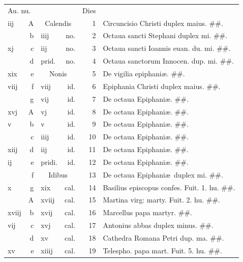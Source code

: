 \documentclass[a5paper,10pt]{book}
\def\ae{æ}
\begin{document}
\begin{center}
\begin{tabular}{l r l r r l}
\multicolumn{2}{l}{\color{red}Au. nu.} & & & \color{red} Dies & \\
iij & \color{red} A & \multicolumn{2}{c}{\color{red} Calendis} & 1 & \color{red}Circuncisio Christi duplex maius. \color{black} \#\#.\\
 & b & iiij & no. & 2 & Octaua sancti Stephani duplex mi. \color{black} \#\#.\\
xj & c & iij & no. & 3 & Octaua sancti Ioannis euan. du. mi. \color{black} \#\#.\\
 & d & \color{red} prid. & no. & 4 & Octaua sanctorum Innocen. dup. mi. \color{black} \#\#.\\
xix & e & \multicolumn{2}{c}{\color{red} Nonis} & 5 & De vigilia epiphani\ae . \color{black} \#\#.\\
viij & f & viij & id. & 6 & \color{red} Epiphania Christi duplex maius. \color{black} \#\#.\\
 & g & vij & id. & 7 & De octaua Epiphani\ae . \color{black} \#\#.\\
xvj & \color{red} A & vj & id. & 8 & De octaua Epiphani\ae . \color{black} \#\#.\\
v & b & v & id. & 9 & De octaua Epiphani\ae . \color{black} \#\#.\\
 & c & iiij & id. & 10 & De octaua Epiphani\ae . \color{black} \#\#.\\
xiij & d & iij & id. & 11 & De octaua Epiphani\ae . \color{black} \#\#.\\
ij & e & \color{red} pridi. & id. & 12 & De octaua Epiphani\ae . \color{black} \#\#.\\
 & f & \multicolumn{2}{c}{\color{red} Idibus} & 13 & De octaua Epiphani\ae \ duplex mi. \color{black} \#\#.\\
x & g & xix & cal. & 14 & Basilius episcopus confes. \color{red} Fuit. 1. hu. \color{black} \#\#.\\
 & \color{red} A & xviij & cal. & 15 & Martina virg: marty. \color{red} Fuit. 2. hu. \color{black} \#\#.\\
xviij & b & xvij & cal. & 16 & Marcellus papa martyr. \color{black} \#\#.\\
vij & c & xvj & cal. & 17 & Antonius abbas duplex minus. \color{black} \#\#.\\
 & d & xv & cal. & 18 & Cathedra Romana Petri dup. ma. \color{black} \#\#.\\
xv & e & xiiij & cal. & 19 & Telespho. papa mart. \color{red} Fuit. 5. hu. \color{black} \#\#.\\

\end{tabular}
\end{center}
\end{document}
